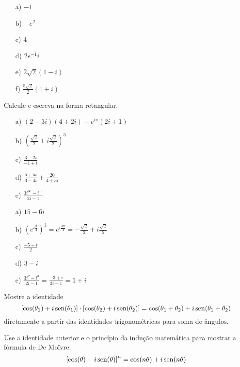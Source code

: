 \begin{Answer}
\begin{itemize}
\item[a)] $-1$
\item[b)] $-e^2$
\item[c)] $4$
\item[d)] $2e^{-1}i$
\item[e)] $2\sqrt{2}\left(1-i\right)$
\item[f)] $\frac{5\sqrt{2}}{2}\left(1+i\right)$
\end{itemize}
 \end{Answer}


\begin{Exercise}Calcule e escreva na forma retangular.
\begin{itemize}
\item[a)] $(2-3i)(4+2i)-e^{i\pi }(2i+1)$
\item[b)] $\left(\frac{\sqrt{2}}{2}+i\frac{\sqrt{2}}{2}\right)^3$
\item[c)] $\frac{3-2i}{-1+i}$
\item[d)] $\frac{5+5i}{3-4i}+\frac{20}{4+3i}$
\item[e)] $\frac{3i^{30}-i^{19}}{2i-1}$
\end{itemize}
\end{Exercise}
\begin{Answer}
\begin{itemize}
\item [a)]$15-6i$
\item [b)]$\left(e^{i\frac{\pi}{4}}\right)^3=e^{i\frac{3\pi}{4}}=-\frac{\sqrt{2}}{2}+i\frac{\sqrt{2}}{2}$
\item [c)]$\frac{-5-i}{2}$
\item [d)]$3-i$
\item [e)]$\frac{3i^{2}-i^{3}}{2i-1}=\frac{-3+i}{2i-1}=1+i$
\end{itemize}
 
\end{Answer}


\begin{Exercise}Mostre a identidade 
$$\left[\cos(\theta_1)+i\operatorname{sen}(\theta_1)\right]\cdot\left[\cos(\theta_2)+i\operatorname{sen}(\theta_2)\right]=\cos(\theta_1+\theta_2)+i\operatorname{sen}(\theta_1+\theta_2)$$
diretamente a partir das identidades trigonométricas para soma de ângulos.
\end{Exercise}

\begin{Exercise}Use a identidade anterior e o princípio da indução matemática para mostrar a fórmula de De Moîvre:
$$\left[\cos(\theta)+i\operatorname{sen}(\theta)\right]^n=\cos(n\theta)+i\operatorname{sen}(n\theta)$$
\end{Exercise}

